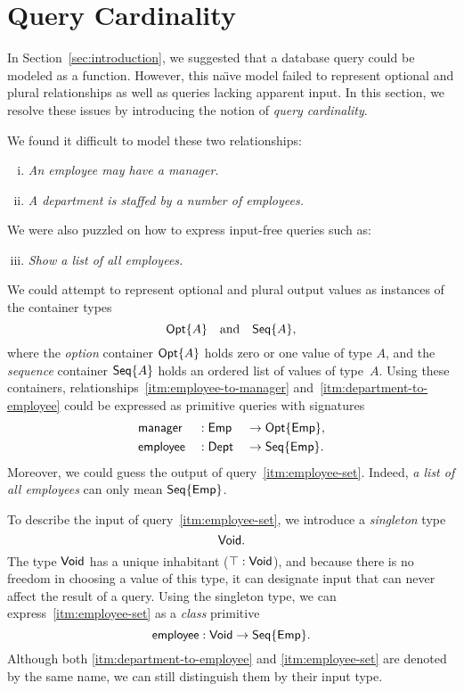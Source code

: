 
\section{Query Cardinality}
\label{sec:cardinality}

In Section~\ref{sec:introduction}, we suggested that a database query could be
modeled as a function.  However, this na\"{\i}ve model failed to represent
optional and plural relationships as well as queries lacking apparent input.
In this section, we resolve these issues by introducing the notion of
\emph{query cardinality}.

We found it difficult to model these two relationships:
\begin{enumerate}[(i)]
\item \label{itm:employee-to-manager}
\emph{An employee may have a manager.}
\item \label{itm:department-to-employee}
\emph{A department is staffed by a number of employees.}
\end{enumerate}
We were also puzzled on how to express input-free queries such as:
\begin{enumerate}[(i)]
\setcounter{enumi}{2}
\item \label{itm:employee-set}
\emph{Show a list of all employees.}
\end{enumerate}

We could attempt to represent optional and plural output values as instances of
the container types
\begin{equation*}
    \mathsf{Opt}{\left\{A\right\}} \quad \text{and} \quad \mathsf{Seq}{\left\{A\right\}},
\end{equation*}
where the \emph{option} container $\mathsf{Opt}{\left\{A\right\}}$ holds zero or one value of type
$A$, and the \emph{sequence} container $\mathsf{Seq}{\left\{A\right\}}$ holds an ordered list of
values of type~$A$.  Using these containers,
relationships~\ref{itm:employee-to-manager}
and~\ref{itm:department-to-employee} could be expressed as primitive queries
with signatures
\begin{alignat*}{3}
    & \mathsf{manager} && : \mathsf{Emp} && \to \mathsf{Opt}{\left\{\mathsf{Emp}\right\}}, \\
    & \mathsf{employee} && : \mathsf{Dept} && \to \mathsf{Seq}{\left\{\mathsf{Emp}\right\}}.
\end{alignat*}
Moreover, we could guess the output of query~\ref{itm:employee-set}.  Indeed,
\emph{a list of all employees} can only mean $\mathsf{Seq}{\left\{\mathsf{Emp}\right\}}$.

To describe the input of query~\ref{itm:employee-set}, we introduce a
\emph{singleton} type
\begin{equation*}
    \mathsf{Void}.
\end{equation*}
The type $\mathsf{Void}$ has a unique inhabitant ($\top:\mathsf{Void}$), and because there is
no freedom in choosing a value of this type, it can designate input that can
never affect the result of a query.  Using the singleton type, we can
express~\ref{itm:employee-set} as a \emph{class} primitive
\begin{equation*}
    \mathsf{employee} : \mathsf{Void} \to \mathsf{Seq}{\left\{\mathsf{Emp}\right\}}.
\end{equation*}
Although both \ref{itm:department-to-employee} and \ref{itm:employee-set} are
denoted by the same name, we can still distinguish them by their input type.

